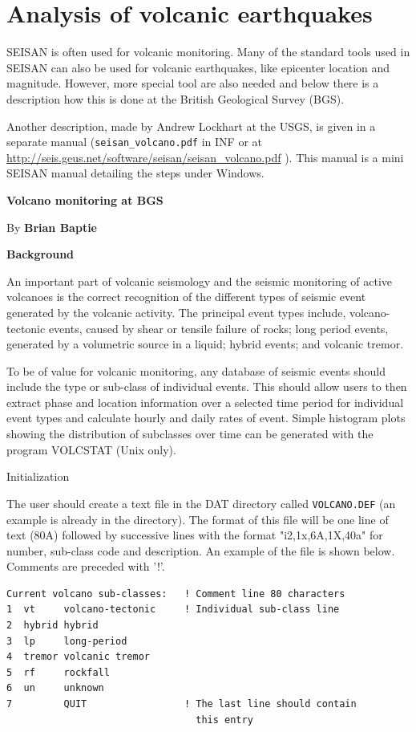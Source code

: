 
\section{Analysis of volcanic earthquakes} 
\label{sect:volcanic}

SEISAN is often used for volcanic monitoring. Many of the standard tools used 
in SEISAN can also be used for volcanic earthquakes, like epicenter 
location and magnitude. However, more special tool are also needed 
and below there is a description how this is done at the British Geological Survey (BGS).

Another description, made by Andrew Lockhart at the USGS, is given 
in a separate manual (\texttt{seisan\_volcano.pdf} in INF or at 
\url{http://seis.geus.net/software/seisan/seisan\_volcano.pdf}
). 
This manual is a mini SEISAN manual detailing the steps under Windows.

\textbf{Volcano monitoring at BGS}

By \textbf{Brian Baptie} 

\textbf{Background}

An important part of volcanic seismology and the seismic monitoring of active volcanoes is the correct recognition of the different types of seismic event generated by the volcanic activity. The principal event types include, volcano-tectonic events, caused by shear or tensile failure of rocks; long period events, generated by a volumetric source in a liquid; hybrid events; and volcanic tremor.  

To be of value for volcanic monitoring, any database of seismic events should include the type or sub-class of individual events. This should allow users to then extract phase and location information over a selected time period for individual event types and calculate hourly and daily rates of event. Simple histogram plots showing the distribution of subclasses over time can be generated with the program VOLCSTAT (Unix only). 

Initialization 

The user should create a text file in the DAT directory called \texttt{VOLCANO.DEF} 
(an example is already in the directory). The format of this file will 
be one line of text (80A) followed by successive lines with the 
format "i2,1x,6A,1X,40a" for number, sub-class code and description. 
An example of the file is shown below. Comments are preceded with '!'. 

\begin{verbatim}
Current volcano sub-classes:   ! Comment line 80 characters 
1  vt     volcano-tectonic     ! Individual sub-class line 
2  hybrid hybrid
3  lp     long-period
4  tremor volcanic tremor 
5  rf     rockfall 
6  un     unknown 
7         QUIT                 ! The last line should contain 
                                 this entry
\end{verbatim}

